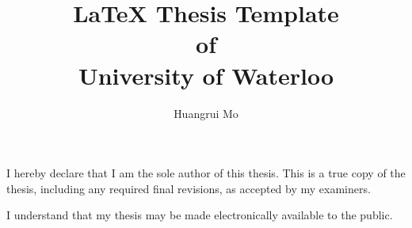 \title[\LaTeX{} Thesis Template of UW]{\LaTeX{} Thesis Template\\ of\\ University of Waterloo}%
\author{Huangrui Mo}
\maketitle
\begin{declaration}
  \noindent
I hereby declare that I am the sole author of this thesis. This is a true copy of the thesis, including any required final revisions, as accepted by my examiners.

  \bigskip

  \noindent
I understand that my thesis may be made electronically available to the public.
\end{declaration}
